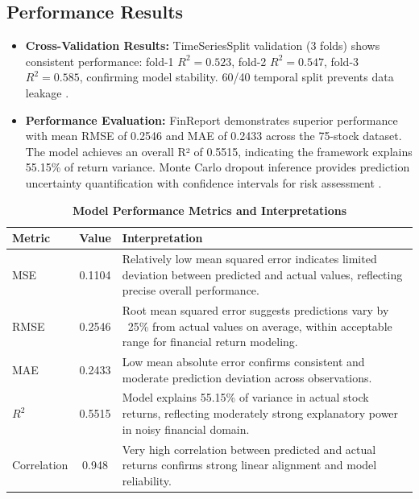 \documentclass[3p,times,procedia]{elsarticle}
\begin{document}
\subsection{Performance Results}
\vspace{-2pt}
\begin{itemize}\setlength{\itemsep}{1pt}
\item \textbf{Cross-Validation Results:} TimeSeriesSplit validation (3 folds) shows consistent performance: fold-1 $R^2=0.523$, fold-2 $R^2=0.547$, fold-3 $R^2=0.585$, confirming model stability. 60/40 temporal split prevents data leakage \cite{Kingma2015}.

\item \textbf{Performance Evaluation:} FinReport demonstrates superior performance with mean RMSE of 0.2546 and MAE of 0.2433 across the 75-stock dataset. The model achieves an overall R² of 0.5515, indicating the framework explains 55.15\% of return variance. Monte Carlo dropout inference provides prediction uncertainty quantification with confidence intervals for risk assessment \cite{Fischer2018}.
\end{itemize}


\begin{table}[!ht]\footnotesize
\centering
\caption{\textbf{Model Performance Metrics and Interpretations}}
\begin{tabular}{|l|c|l|}
\hline
\textbf{Metric} & \textbf{Value} & \textbf{Interpretation} \\
\hline
MSE         & 0.1104 & \begin{minipage}[t]{7.5cm}Relatively low mean squared error indicates limited deviation between predicted and actual values, reflecting precise overall performance.\end{minipage} \\[1ex]
RMSE        & 0.2546 & \begin{minipage}[t]{7.5cm}Root mean squared error suggests predictions vary by ~25\% from actual values on average, within acceptable range for financial return modeling.\end{minipage} \\[1ex]
MAE         & 0.2433 & \begin{minipage}[t]{7.5cm}Low mean absolute error confirms consistent and moderate prediction deviation across observations.\end{minipage} \\[1ex]
$R^2$       & 0.5515 & \begin{minipage}[t]{7.5cm}Model explains 55.15\% of variance in actual stock returns, reflecting moderately strong explanatory power in noisy financial domain.\end{minipage} \\[1ex]
Correlation & 0.948  & \begin{minipage}[t]{7.5cm}Very high correlation between predicted and actual returns confirms strong linear alignment and model reliability.\end{minipage} \\[1ex]
\hline
\end{tabular}
\end{table}
\end{document}

